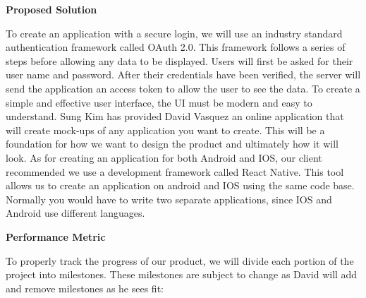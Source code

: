 \documentclass[10pt,letterpaper]{article}
\begin{document}
\begin{center}
\large
\textbf{Proposed Solution}
\end{center}

To create an application with a secure login, we will use an industry standard authentication framework called OAuth 2.0. This framework follows a series of steps before allowing any data to be displayed. Users will first be asked for their user name and password. After their credentials have been verified, the server will send the application an access token to allow the user to see the data. To create a simple and effective user interface, the UI must be modern and easy to understand. Sung Kim has provided David Vasquez an online application that will create mock-ups of any application you want to create. This will be a foundation for how we want to design the product and ultimately how it will look. As for creating an application for both Android and IOS, our client recommended we use a development framework called React Native. This tool allows us to create an application on android and IOS using the same code base. Normally you would have to write two separate applications, since IOS and Android use different languages.\\

\begin{center}
\large
\textbf{Performance Metric}
\end{center}

To properly track the progress of our product, we will divide each portion of the project into milestones. These milestones are subject to change as David will add and remove milestones as he sees fit:
\end{document}
